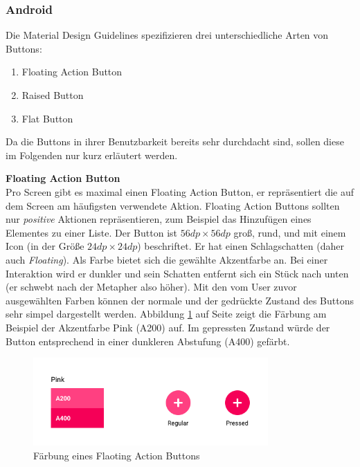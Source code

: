 \subsubsection{Android}

Die Material Design Guidelines spezifizieren drei unterschiedliche Arten von Buttons:

\begin{enumerate}
	\item Floating Action Button
	\item Raised Button
	\item Flat Button
\end{enumerate}

Da die Buttons in ihrer Benutzbarkeit bereits sehr durchdacht sind, sollen diese im Folgenden nur kurz erläutert werden.

\textbf{Floating Action Button} \\
Pro Screen gibt es maximal einen Floating Action Button, er repräsentiert die auf dem Screen am häufigsten verwendete Aktion. Floating Action Buttons sollten nur \textit{positive} Aktionen repräsentieren, zum Beispiel das Hinzufügen eines Elementes zu einer Liste.
Der Button ist $56dp \times 56dp$ groß, rund, und mit einem Icon (in der Größe $24dp \times 24dp$) beschriftet. Er hat einen Schlagschatten (daher auch \textit{Floating}). Als Farbe bietet sich die gewählte Akzentfarbe an. Bei einer Interaktion wird er dunkler und sein Schatten entfernt sich ein Stück nach unten (er schwebt nach der Metapher also höher).
Mit den vom User zuvor ausgewählten Farben können der normale und der gedrückte Zustand des Buttons sehr simpel dargestellt werden. Abbildung \ref{fig:fab-colors} auf Seite \pageref{fig:fab-colors} zeigt die Färbung am Beispiel der Akzentfarbe Pink (A200) auf. Im gepressten Zustand würde der Button entsprechend in einer dunkleren Abstufung (A400) gefärbt.

\begin{figure}[h]
    \centering
    \includegraphics[width=0.8\textwidth]{images/FAB-colors.png}
    \caption{Färbung eines Flaoting Action Buttons}
    \label{fig:fab-colors}
\end{figure}

